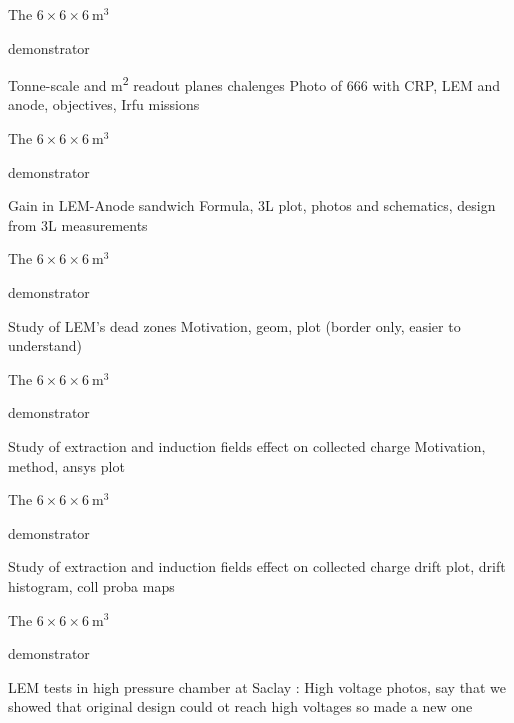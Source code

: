 \documentclass[10pt]{beamer}
\begin{document}
    \begin{frame}{The \texorpdfstring{$6 \times 6 \times \SI{6}{\meter\cubed}$}{666}
    		\begin{scriptsize}
    		\end{scriptsize} demonstrator}{Tonne-scale and \si{\meter\squared} readout planes chalenges}
	    Photo of 666 with CRP, LEM and anode, objectives, Irfu missions
    \end{frame}
    
    \begin{frame}{The \texorpdfstring{$6 \times 6 \times \SI{6}{\meter\cubed}$}{666}
    		\begin{scriptsize}
    		\end{scriptsize} demonstrator}{Gain in LEM-Anode sandwich}
    	Formula, 3L plot, photos and schematics, design from 3L measurements
    \end{frame}
    
    \begin{frame}{The \texorpdfstring{$6 \times 6 \times \SI{6}{\meter\cubed}$}{666}
    		\begin{scriptsize}
    		\end{scriptsize} demonstrator}{Study of LEM's dead zones}
    	Motivation, geom, plot (border only, easier to understand)
    \end{frame}
    
    \begin{frame}{The \texorpdfstring{$6 \times 6 \times \SI{6}{\meter\cubed}$}{666}
    		\begin{scriptsize}
    		\end{scriptsize} demonstrator}{Study of extraction and induction fields effect on collected charge}
    	Motivation, method, ansys plot
    \end{frame}
    
    \begin{frame}{The \texorpdfstring{$6 \times 6 \times \SI{6}{\meter\cubed}$}{666}
    		\begin{scriptsize}
    		\end{scriptsize} demonstrator}{Study of extraction and induction fields effect on collected charge}
    	drift plot, drift histogram, coll proba maps
    \end{frame}
    
    \begin{frame}{The \texorpdfstring{$6 \times 6 \times \SI{6}{\meter\cubed}$}{666}
    		\begin{scriptsize}
    		\end{scriptsize} demonstrator}{LEM tests in high pressure chamber at Saclay : High voltage}
    	photos, say that we showed that original design could ot reach high voltages so made a new one
    \end{frame}
    
\end{document}
